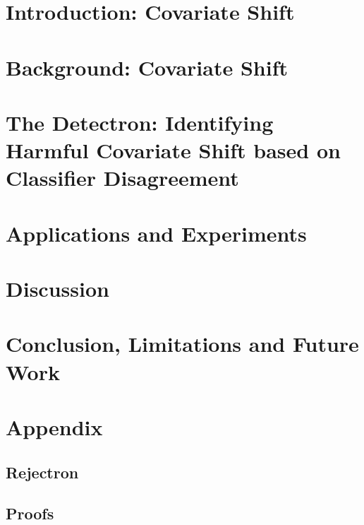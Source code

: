 \documentclass{ut-thesis}
\begin{document}
    \chapter[Introduction]{Introduction: Covariate Shift}
    \label{ch:intro}

    


    \chapter[Background: Covariate Shift]{Background: Covariate Shift}\label{ch:related}

    

    \chapter[Detectron: Methodlogy]{The Detectron: Identifying Harmful Covariate Shift based on Classifier Disagreement}\label{ch:detectron}

    


    \chapter{Applications and Experiments}\label{ch:experiments}
    


    \chapter{Discussion}\label{ch:discussion}
    


    \chapter{Conclusion, Limitations and Future Work}\label{ch:conclusion}
    

    

    \appendix


    \chapter{Appendix}\label{ch:appendix}


    \section{Rejectron}\label{sec:rejectron}
    


    \section{Proofs}\label{sec:proofs}
    

    
\end{document}

